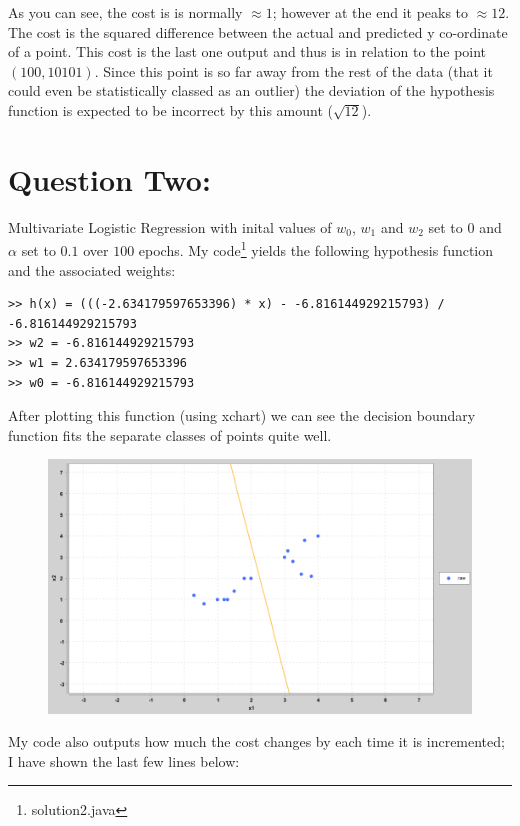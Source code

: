 \documentclass[a4paper]{article}
\begin{document}
\noindent As you can see, the cost is is normally $\approx 1$; however at the end it peaks to $\approx 12$. The cost is the squared difference between the actual and predicted y co-ordinate of a point. This cost is the last one output and thus is in relation to the point $(100,10101)$. Since this point is so far away from the rest of the data (that it could even be statistically classed as an outlier) the deviation of the hypothesis function is expected to be incorrect by this amount ($\sqrt{12}$).\newpage

\section*{Question Two:}
Multivariate Logistic Regression with inital values of $w_{0}$, $w_{1}$ and $w_{2}$ set to $0$ and $\alpha$ set to $0.1$ over $100$ epochs. My code\footnote{solution2.java} yields the following hypothesis function and the associated weights:
\begin{verbatim}
>> h(x) = (((-2.634179597653396) * x) - -6.816144929215793) / -6.816144929215793
>> w2 = -6.816144929215793
>> w1 = 2.634179597653396
>> w0 = -6.816144929215793
\end{verbatim}

\noindent After plotting this function (using xchart) we can see the decision boundary function fits the separate classes of points quite well.

\begin{figure}[h]
\includegraphics[scale=.4]{g2.png}
\centering
\end{figure}

\noindent My code also outputs how much the cost changes by each time it is incremented; I have shown the last few lines below:
\end{document}
